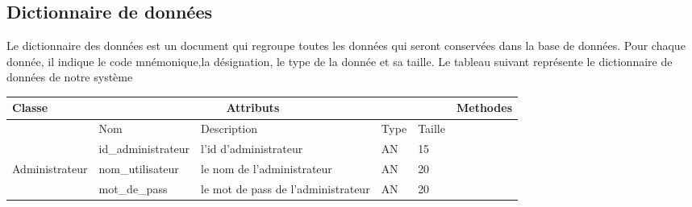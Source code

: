 \documentclass[edit,12pt,a4paper,ChapStyle,oneside,doubleinterligne]{report}
\begin{document}
\subsection{Dictionnaire de données}
Le dictionnaire des données est un document qui regroupe toutes les données qui seront conservées dans la base de données. Pour chaque donnée, il indique le code mnémonique,la
désignation, le type de la donnée et sa taille.
\newline Le tableau suivant représente le dictionnaire de données de notre système
\begin{table}[H]
    \centering
    \begin{tabular}{ | m{} | m{}| m{3cm} |m{}|m{}|l|}
    \hline
         Classe&\multicolumn{3}{c}{Attributs}&\phantom{h} &Methodes\\
         \hline &Nom&Description&Type&Taille&\\\cline{2-5}
                                        &id\_administrateur&l'id d'administrateur&AN&15& \\\cline{2-5}
                        Administrateur  &nom\_utilisateur&le nom de l'administrateur&AN&20& \\\cline{2-5}
                                        &mot\_de\_pass&le mot de pass de l'administrateur &AN&20& \\\hline

 \end{tabular}
\end{table}
\end{document}
